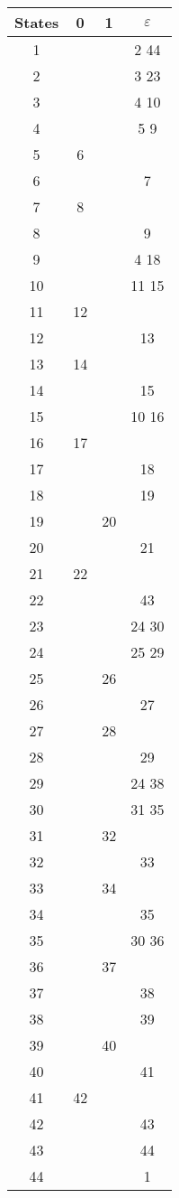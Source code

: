 \begin{tabular}[c]{|c|c|c|c|} \hline
  States & 0 & 1 & $\varepsilon$ \\ \hline
     1 & & & 2 44 \\ \hline
     2 & & & 3 23 \\ \hline
     3 & & & 4 10 \\ \hline
     4 & & & 5 9 \\ \hline
     5 & 6 & & \\ \hline
     6 & & & 7 \\ \hline
     7 & 8 & & \\ \hline
     8 & & & 9 \\ \hline
     9 & & & 4 18 \\ \hline
    10 & & & 11 15\\ \hline
    11 & 12 & & \\ \hline
    12 & & & 13 \\ \hline
    13 & 14 & & \\ \hline
    14 & & & 15 \\ \hline
    15 & & & 10 16\\ \hline
    16 & 17 & & \\ \hline
    17 & & & 18\\ \hline
    18 & & & 19\\ \hline
    19 & & 20 & \\ \hline
    20 & & & 21 \\ \hline
    21 & 22 & & \\ \hline
    22 & & & 43 \\ \hline
    23 & & & 24 30 \\ \hline
    24 & & & 25 29 \\ \hline
    25 & & 26 & \\ \hline
    26 & & & 27 \\ \hline
    27 & & 28 & \\ \hline
    28 & & & 29 \\ \hline
    29 & & & 24 38 \\ \hline
    30 & & & 31 35 \\ \hline
    31 & & 32 & \\ \hline
    32 & & & 33 \\ \hline
    33 & & 34 & \\ \hline
    34 & & & 35 \\ \hline
    35 & & & 30 36 \\ \hline
    36 & & 37 & \\ \hline
    37 & & & 38 \\ \hline
    38 & & & 39 \\ \hline
    39 & & 40 & \\ \hline
    40 & & & 41 \\ \hline
    41 & 42 & & \\ \hline
    42 & & & 43 \\ \hline
    43 & & & 44 \\ \hline
    44 & & & 1 \\ \hline
\end{tabular}
